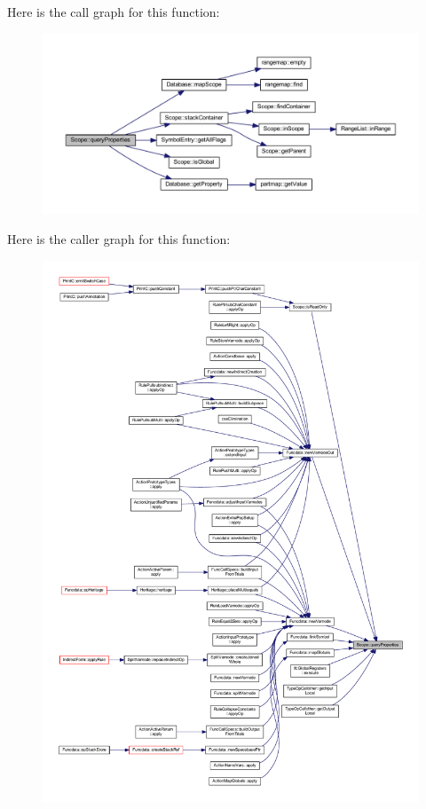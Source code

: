 Here is the call graph for this function\+:
\nopagebreak
\begin{figure}[H]
\begin{center}
\leavevmode
\includegraphics[width=350pt]{class_scope_a1b8c2c2302eba2666e319a4c18a67d51_cgraph}
\end{center}
\end{figure}
Here is the caller graph for this function\+:
\nopagebreak
\begin{figure}[H]
\begin{center}
\leavevmode
\includegraphics[width=350pt]{class_scope_a1b8c2c2302eba2666e319a4c18a67d51_icgraph}
\end{center}
\end{figure}
\mbox{\label{class_scope_ad1b4a9faa5d12ef3b0be55810dac6d35}} 
